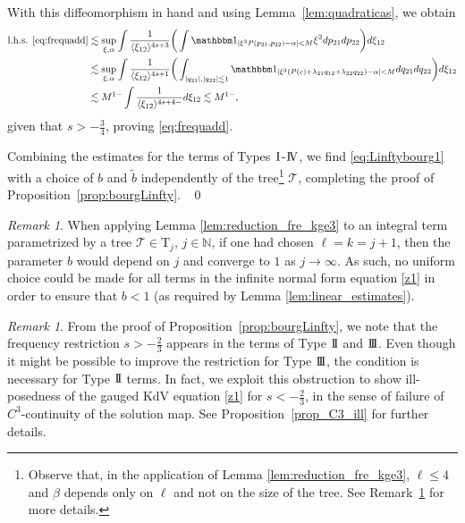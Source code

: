 \documentclass[a4paper,
11pt,  reqno]{amsart}
\newcommand{\I}{\hspace{0.2mm}\textup{I}\hspace{0.2mm}}
\newcommand{\II}{\textup{I \hspace{-2.9mm} I} }
\newcommand{\III}{\textup{I \hspace{-2.9mm} I \hspace{-2.9mm} I}}
\newcommand{\IV}{\textup{I \hspace{-2.9mm} V}}
\newcommand{\5}{\textup{V}}
\newcommand{\ind}{\mathbbm 1}
\newcommand{\les}{\lesssim}
\newcommand{\wt}{\widetilde}
\theoremstyle{remark}
\newtheorem{remark}[theorem]{Remark}
\newcommand{\TT}{\mathcal{T}}
\newcommand{\Tr}{\mathrm{T}}
\newcommand{\al}{\alpha}
\newcommand{\ld}{\lambda}
\newcommand{\jb}[1]
{\langle #1 \rangle}
\newcommand{\N}{\mathbb{N}}
\numberwithin{equation}{section}
\numberwithin{theorem}{section}
\begin{document}
With this diffeomorphism in hand and using Lemma~\ref{lem:quadraticas}, we obtain
\begin{align}
\text{l.h.s. } \eqref{eq:frequadd}
&
\les
\sup_{\xi, \al}
\int \frac{ 1 }{ \jb{\xi_{12}}^{4s+3} }
\bigg(
\int \ind_{|\xi^3 P( p_{21}, p_{22}) - \al| < M } \xi^2 dp_{21} dp_{22}
\bigg)
d\xi_{12}
\\
&
\les
\sup_{\xi, \al}
\int \frac{1}{\jb{\xi_{12}}^{4s+1}}
\bigg(
\int_{|q_{21}| ,  |q_{22}| \les 1}
\ind_{|\xi^3 (P(c) + \ld_{21} q_{12} + \ld_{22} q_{22}) - \al| < M  }
d q_{21} dq_{22}
\bigg)
d\xi_{12}
\\
&
\les M^{1-} \int \frac{1}{\jb{\xi_{12}}^{4s+4-}} d \xi_{12}
\les M^{1-},
\end{align}
given that $s> -\frac34$, proving \eqref{eq:frequadd}.

\smallskip

Combining the estimates for the terms of Types $\I$-$\IV$, we find \eqref{eq:Linftybourg1} with a choice of $b$ and $\wt{b}$ independently of the tree\footnote{Observe that, in the application of Lemma \ref{lem:reduction_fre_kge3}, $\ell\le 4$ and $\beta$ depends only on $\ell$ and not on the size of the tree. See Remark~\ref{REM:b} for more details.} $\TT$,  completing the proof of Proposition~\ref{prop:bourgLinfty}. ~\qed

\bigskip


\begin{remark}\rm
\label{REM:b}
    When applying Lemma \ref{lem:reduction_fre_kge3} to an integral term parametrized by a tree $\TT\in \Tr_j$, $j\in\N$, if one had chosen $\ell=k = j+1$, then the parameter $b$ would depend on $j$ and converge to $1$  as $j\to \infty$. As such, no uniform choice could be made for all terms in the infinite normal form equation \eqref{z1} in order to ensure that $b<1$ (as required by Lemma \ref{lem:linear_estimates}).
\end{remark}



\begin{remark}
\rm


From the proof of Proposition~\ref{prop:bourgLinfty}, we note that the frequency restriction $s> -\frac23$ appears in the terms of Type $\II$ and $\III$. Even though it might be possible to improve the restriction for Type $\III$, the condition is necessary for Type $\II$ terms.
In fact,
we exploit this obstruction to show ill-posedness of the gauged KdV equation \eqref{z1}
for $s<-\frac23$, in the sense of failure of $C^3$-continuity of the solution map. See Proposition~\ref{prop_C3_ill} for further details.

\end{remark}
\end{document}
